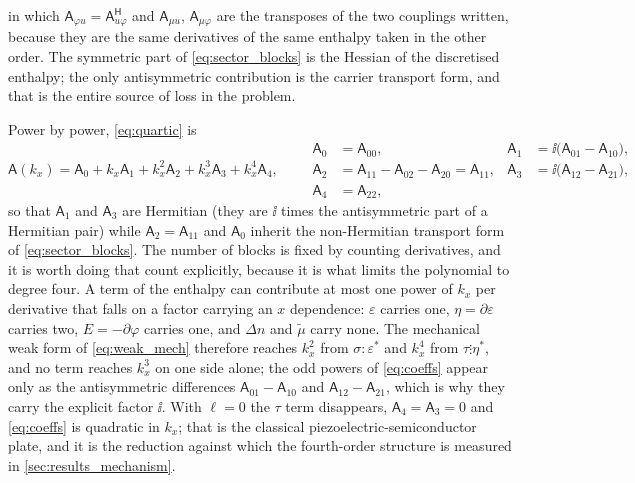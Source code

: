 in which $\mathsf A_{\varphi u}=\mathsf A_{u\varphi}^{\mathsf H}$ and
$\mathsf A_{\mu u}$, $\mathsf A_{\mu\varphi}$ are the transposes of the two
couplings written, because they are the same derivatives of the same enthalpy
taken in the other order.  The symmetric part of \eqref{eq:sector_blocks} is the
Hessian of the discretised enthalpy; the only antisymmetric contribution is the
carrier transport form, and that is the entire source of loss in the problem.

Power by power, \eqref{eq:quartic} is
\begin{equation}
\label{eq:coeffs}
\mathsf A(k_x)=\mathsf A_0+k_x\mathsf A_1+k_x^{2}\mathsf A_2
+k_x^{3}\mathsf A_3+k_x^{4}\mathsf A_4,
\qquad
\begin{aligned}
\mathsf A_0&=\mathsf A_{00},&
\mathsf A_1&=\ii\bigl(\mathsf A_{01}-\mathsf A_{10}\bigr),\\
\mathsf A_2&=\mathsf A_{11}-\mathsf A_{02}-\mathsf A_{20}=\mathsf A_{11},&
\mathsf A_3&=\ii\bigl(\mathsf A_{12}-\mathsf A_{21}\bigr),\\
\mathsf A_4&=\mathsf A_{22},&&
\end{aligned}
\end{equation}
so that $\mathsf A_1$ and $\mathsf A_3$ are Hermitian (they are $\ii$ times the
antisymmetric part of a Hermitian pair) while $\mathsf A_2=\mathsf A_{11}$ and
$\mathsf A_0$ inherit the non-Hermitian transport form of
\eqref{eq:sector_blocks}.  The number of blocks is fixed by counting derivatives,
and it is worth doing that count explicitly, because it is what limits the
polynomial to degree four.  A term of the enthalpy can contribute at most one
power of $k_x$ per derivative that falls on a factor carrying an $x$ dependence:
$\varepsilon$ carries one, $\eta=\partial\varepsilon$ carries two, $E=-\partial
\varphi$ carries one, and $\Delta n$ and $\widetilde\mu$ carry none.  The
mechanical weak form of \eqref{eq:weak_mech} therefore reaches $k_x^{2}$ from
$\sigma:\varepsilon^{*}$ and $k_x^{4}$ from $\tau\vdots\eta^{*}$, and no term
reaches $k_x^{3}$ on one side alone; the odd powers of \eqref{eq:coeffs} appear
only as the antisymmetric differences $\mathsf A_{01}-\mathsf A_{10}$ and
$\mathsf A_{12}-\mathsf A_{21}$, which is why they carry the explicit factor
$\ii$.  With $\ell=0$ the $\tau$ term disappears, $\mathsf A_4=\mathsf A_3=0$ and
\eqref{eq:coeffs} is quadratic in $k_x$; that is the classical
piezoelectric-semiconductor plate, and it is the reduction against which the
fourth-order structure is measured in \cref{sec:results_mechanism}.

